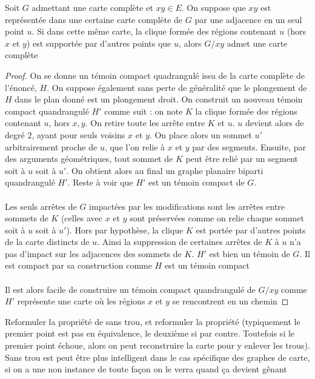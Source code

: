 \documentclass{scrartcl}
\begin{document}
\begin{flushleft}
\begin{prop}
    Soit $G$ admettant une carte complète et $xy \in E$.
    On suppose que $xy$ est représentée dans une certaine carte complète de $G$ par une adjacence en un seul point $u$.
    Si dans cette même carte, la clique formée des régions contenant $u$ (hors $x$ et $y$) est supportée par d'autres points que $u$,
    alors $G / xy$ admet une carte complète
\end{prop}

\begin{proof}
    On se donne un témoin compact quadrangulé issu de la carte complète de l'énoncé, $H$. On suppose également sans perte de généralité que le plongement
    de $H$ dans le plan donné est un plongement droit. On construit un nouveau témoin compact quandrangulé
    $H'$ comme suit : on note $K$ la clique formée des régions contenant $u$, hors $x, y$. On retire toute les arrête entre $K$ et $u$.
    $u$ devient alors de degré $2$, ayant pour seuls voisins $x$ et $y$. On place alors un sommet $u'$ arbitrairement proche de $u$, que l'on
    relie à $x$ et $y$ par des segments. Ensuite, par des arguments géométriques, tout sommet de $K$ peut être relié par un segment soit à
    $u$ soit à $u'$. On obtient alors au final un graphe planaire biparti quandrangulé $H'$. Reste à voir que $H'$ est un témoin compact de $G$.
    \\~\\
    Les seuls arrêtes de $G$ impactées par les modifications sont les arrêtes entre sommets de $K$ (celles avec $x$ et $y$ sont préservées
    comme on relie chaque sommet soit à $u$ soit à $u'$). Hors par hypothèse, la clique $K$ est portée par d'autres points de la carte distincts
    de $u$. Ainsi la suppression de certaines arrêtes de $K$ à $u$ n'a pas d'impact sur les adjacences des sommets de $K$. $H'$ est bien un témoin
    de $G$. Il est compact par sa construction comme $H$ est un témoin compact
    \\~\\
    Il est alors facile de construire un témoin compact quandrangulé de $G / xy$ comme $H'$ représente une carte où les régions $x$ et $y$
    se rencontrent en un chemin
\end{proof}

Reformuler la propriété de sans trou, et reformuler la propriété (typiquement le premier point est pas en équivalence, le deuxième si
par contre. Toutefois si le premier point échoue, alors on peut reconstruire la carte pour y enlever les trous). Sans trou est peut être
plus intelligent dans le cas spécifique des graphes de carte, si on a une non instance de toute façon on le verra quand ça devient gênant


\end{flushleft}
\end{document}
